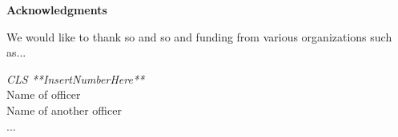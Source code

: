 \documentclass[12pt]{article}
\begin{document}
\begin{center}
{\selectfont \bfseries Acknowledgments}
\end{center}

\vspace{1em}


We would like to thank so and so and funding from various organizations such as...



\vspace{1em}

\noindent \textit{CLS **InsertNumberHere**}\\
Name of officer\\
Name of another officer\\
...
\end{document}
